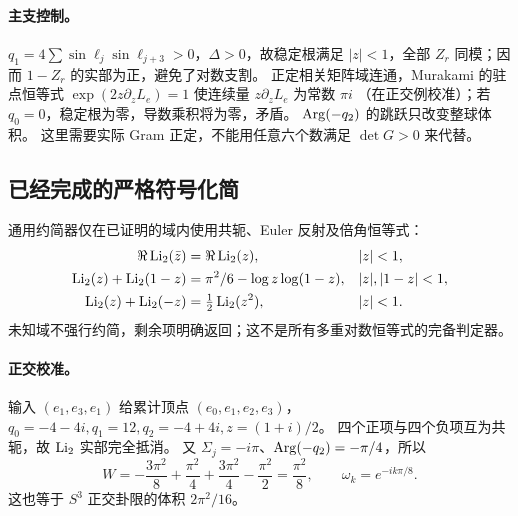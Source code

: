 \paragraph{主支控制。}
$q_1=4\sum\sin\ell_j\sin\ell_{j+3}>0$，$\Delta>0$，故稳定根满足
$|z|<1$，全部 $Z_r$ 同模；因而 $1-Z_r$ 的实部为正，避免了对数支割。
正定相关矩阵域连通，Murakami 的驻点恒等式
$\exp(2z\partial_zL_e)=1$ 使连续量 $z\partial_zL_e$ 为常数 $\pi i$
（在正交例校准）；若 $q_0=0$，稳定根为零，导数乘积将为零，矛盾。
$\operatorname{Arg}(-q_2)$ 的跳跃只改变整球体积。
这里需要实际 Gram 正定，不能用任意六个数满足 $\det G>0$ 来代替。

\subsection{已经完成的严格符号化简}

通用约简器仅在已证明的域内使用共轭、Euler 反射及倍角恒等式：
\begin{align}
\Re\operatorname{Li}_2(\bar z)&=\Re\operatorname{Li}_2(z),&& |z|<1,\\
\operatorname{Li}_2(z)+\operatorname{Li}_2(1-z)&=\pi^2/6-\log z\log(1-z),&&|z|,|1-z|<1,\\
\operatorname{Li}_2(z)+\operatorname{Li}_2(-z)&=\tfrac12\operatorname{Li}_2(z^2),&&|z|<1.
\end{align}
未知域不强行约简，剩余项明确返回；这不是所有多重对数恒等式的完备判定器。

\paragraph{正交校准。}
输入 $(e_1,e_3,e_1)$ 给累计顶点 $(e_0,e_1,e_2,e_3)$，
$q_0=-4-4i,q_1=12,q_2=-4+4i,z=(1+i)/2$。
四个正项与四个负项互为共轭，故 $\operatorname{Li}_2$ 实部完全抵消。
又 $\Sigma_j=-i\pi$、$\operatorname{Arg}(-q_2)=-\pi/4$，所以
\[
 W=-\frac{3\pi^2}{8}+\frac{\pi^2}{4}+\frac{3\pi^2}{4}-\frac{\pi^2}{2}
   =\frac{\pi^2}{8},\qquad \omega_k=e^{-ik\pi/8}.
\]
这也等于 $S^3$ 正交卦限的体积 $2\pi^2/16$。

